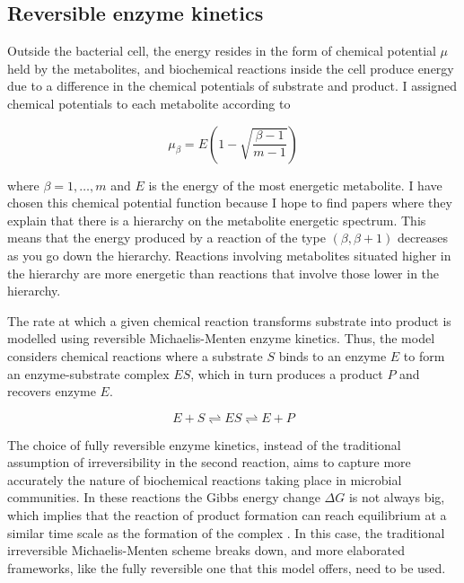 \documentclass[titlepage,11pt]{article}
\begin{document}
	\subsection{Reversible enzyme kinetics}\label{subsed:reversible_enzyme_kinetics}
		Outside the bacterial cell, the energy resides in the form of chemical potential $ \mu $ held by the metabolites, and biochemical reactions inside the cell produce energy due to a difference in the chemical potentials of substrate and product. I assigned chemical potentials to each metabolite according to
		\begin{linenomath*}	
			\begin{equation}
			\mu_{\beta} = E \left(1 - \sqrt{\frac{\beta-1}{m-1}}\right)
			\end{equation}
		\end{linenomath*}	
		where $ \beta = 1, \dots, m $ and $ E $ is the energy of the most energetic metabolite.
		I have chosen this chemical potential function because I hope to find papers where they explain that there is a hierarchy on the metabolite energetic spectrum. This means that the energy produced by a reaction of the type $ (\beta, \beta+1) $ decreases as you go down the hierarchy. Reactions involving metabolites situated higher in the hierarchy are more energetic than reactions that involve those lower in the hierarchy.\par
		The rate at which a given chemical reaction transforms substrate into product is modelled using reversible Michaelis-Menten enzyme kinetics. Thus, the model considers chemical reactions where a substrate $ S $ binds to an enzyme $ E $ to form an enzyme-substrate complex $ ES $, which in turn produces a product $ P $ and recovers enzyme $ E $. 
		\begin{linenomath*}	
			\begin{equation}\label{eq:react_shceme}
			E + S \rightleftharpoons ES \rightleftharpoons E + P
			\end{equation}	
		\end{linenomath*}
		The choice of fully reversible enzyme kinetics, instead of the traditional assumption of irreversibility in the second reaction, aims to capture more accurately the nature of biochemical reactions taking place in microbial communities. In these reactions the Gibbs energy change $ \Delta G $ is not always big, which implies that the reaction of product formation can reach equilibrium at a similar time scale as the formation of the complex \citep{Keener2008}. In this case, the traditional irreversible Michaelis-Menten scheme breaks down, and more elaborated frameworks, like the fully reversible one that this model offers, need to be used.\par
\end{document}
